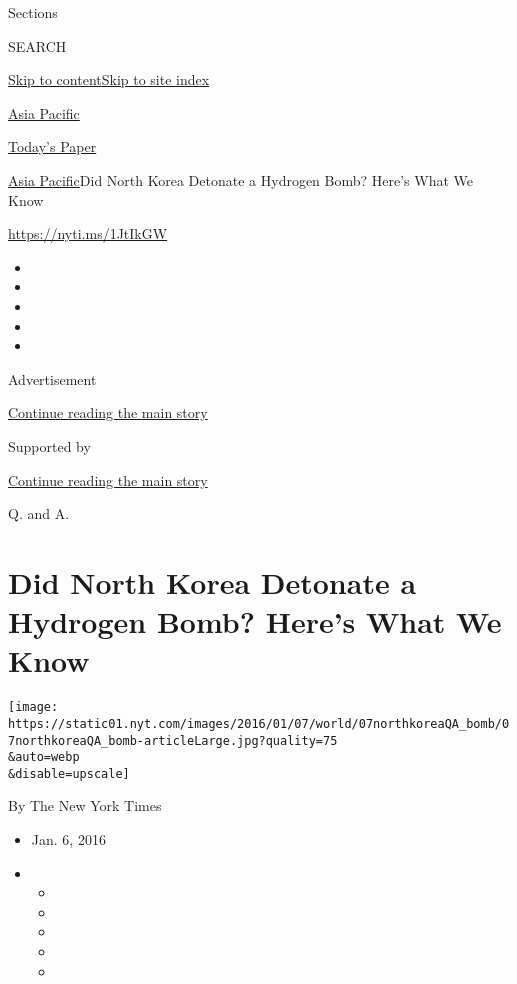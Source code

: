 Sections

SEARCH

\protect\hyperlink{site-content}{Skip to
content}\protect\hyperlink{site-index}{Skip to site index}

\href{https://www.nytimes.com/section/world/asia}{Asia Pacific}

\href{https://myaccount.nytimes.com/auth/login?response_type=cookie\&client_id=vi}{}

\href{https://www.nytimes.com/section/todayspaper}{Today's Paper}

\href{/section/world/asia}{Asia Pacific}\textbar{}Did North Korea
Detonate a Hydrogen Bomb? Here's What We Know

\url{https://nyti.ms/1JtIkGW}

\begin{itemize}
\item
\item
\item
\item
\item
\end{itemize}

Advertisement

\protect\hyperlink{after-top}{Continue reading the main story}

Supported by

\protect\hyperlink{after-sponsor}{Continue reading the main story}

Q. and A.

\hypertarget{did-north-korea-detonate-a-hydrogen-bomb-heres-what-we-know}{%
\section{Did North Korea Detonate a Hydrogen Bomb? Here's What We
Know}\label{did-north-korea-detonate-a-hydrogen-bomb-heres-what-we-know}}

\texttt{[image: https://static01.nyt.com/images/2016/01/07/world/07northkoreaQA\_bomb/07northkoreaQA\_bomb-articleLarge.jpg?quality=75\\\&auto=webp\\\&disable=upscale]}

By The New York Times

\begin{itemize}
\item
  Jan. 6, 2016
\item
  \begin{itemize}
  \item
  \item
  \item
  \item
  \item
  \end{itemize}
\end{itemize}

